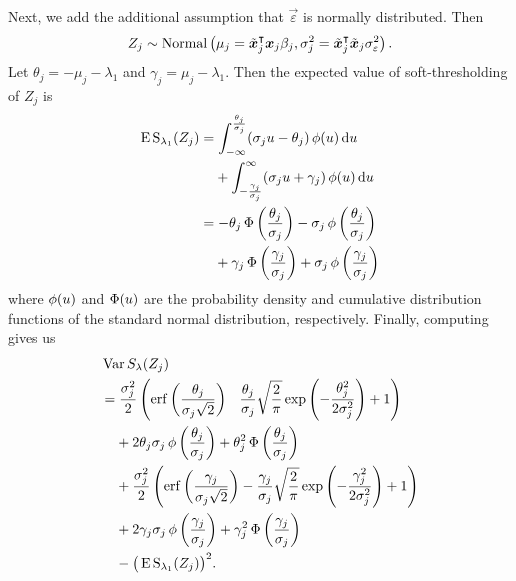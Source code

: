 Next, we add the additional assumption that \(\vec{\varepsilon}\) is normally distributed.
Then
\[
  {Z_j} \sim \operatorname{Normal}\left(\mu_j = \tilde{\boldsymbol{x}}_j^\intercal\boldsymbol{x}_j \beta_j, \sigma_j^2 = \tilde{\boldsymbol{x}}_j^\intercal\tilde{\boldsymbol{x}}_j \sigma_\varepsilon^2 \right).
\]
Let \(\theta_j = -\mu_j -\lambda_1 \) and \(\gamma_j = \mu_j - \lambda_1\). Then the
expected value of soft-thresholding of \({Z_j}\) is
\begin{align}
  \E \st_{\lambda_1}({Z_j}) & = \int_{-\infty}^\frac{\theta_j}{\sigma_j} (\sigma_j u - \theta_j) \pdf(u) \du u                                                                     \nonumber  \\
                            & \phantom{={}}+ \int_{-\frac{\gamma_j}{\sigma_j}}^\infty (\sigma_j u + \gamma_j) \pdf(u) \du u                                               \nonumber           \\
                            & = -\theta_j \cdf\left(\frac{\theta_j}{\sigma_j}\right) - \sigma_j \pdf\left(\frac{\theta_j}{\sigma_j}\right)                                          \nonumber \\
                            & \phantom{={}}+ \gamma_j \cdf\left(\frac{\gamma_j}{\sigma_j}\right) + \sigma_j \pdf\left(\frac{\gamma_j}{\sigma_j}\right) \label{eq:mean-centered-eval}
\end{align}
where \(\operatorname{\phi}(u)\) and \(\operatorname{\Phi}(u)\) are the probability density and cumulative distribution
functions of the standard normal distribution, respectively. Finally, computing  gives us
\begin{align}
  \label{eq:mean-centered-variance}
   & \var{S_\lambda(Z_j)}                                                                                                                                                                                       \nonumber  \\
   & = \frac{\sigma_j^2}{2} \left( \erf\left(\frac{\theta_j}{\sigma_j\sqrt{2}}\right) \phantom{-{}} \frac{\theta_j}{\sigma_j}\sqrt{\frac{2}{\pi}} \exp\left(-\frac{\theta_j^2}{2\sigma_j^2}\right) + 1 \right)  \nonumber  \\
   & \phantom{={}} + 2 \theta_j \sigma_j \pdf \left(\frac{\theta_j}{\sigma_j}\right) + \theta_j^2 \cdf\left(\frac{\theta_j}{\sigma_j}\right) \nonumber                                                                     \\
   & \phantom{={}} + \frac{\sigma_j^2}{2} \left( \erf\left(\frac{\gamma_j}{\sigma_j\sqrt{2}}\right) - \frac{\gamma_j}{\sigma_j}\sqrt{\frac{2}{\pi}} \exp\left(-\frac{\gamma_j^2}{2\sigma_j^2}\right) + 1 \right) \nonumber \\
   & \phantom{={}} + 2 \gamma_j \sigma_j \pdf \left(\frac{\gamma_j}{\sigma_j}\right) + \gamma_j^2 \cdf\left(\frac{\gamma_j}{\sigma_j}\right) \nonumber                                                                     \\
   & \phantom{={}} - \big(\E \st_{\lambda_1}({Z_j})\big)^2.
\end{align}

